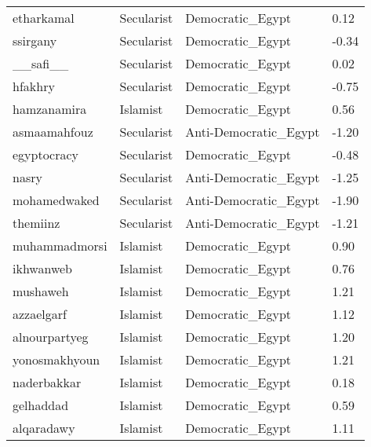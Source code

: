 \begin{longtable}{llll}
  etharkamal & Secularist & Democratic\_Egypt & 0.12 \\ 
  ssirgany & Secularist & Democratic\_Egypt & -0.34 \\ 
  \_\_safi\_\_ & Secularist & Democratic\_Egypt & 0.02 \\ 
  hfakhry & Secularist & Democratic\_Egypt & -0.75 \\ 
  hamzanamira & Islamist & Democratic\_Egypt & 0.56 \\ 
  asmaamahfouz & Secularist & Anti-Democratic\_Egypt & -1.20 \\ 
  egyptocracy & Secularist & Democratic\_Egypt & -0.48 \\ 
  nasry & Secularist & Anti-Democratic\_Egypt & -1.25 \\ 
  mohamedwaked & Secularist & Anti-Democratic\_Egypt & -1.90 \\ 
  themiinz & Secularist & Anti-Democratic\_Egypt & -1.21 \\ 
  muhammadmorsi & Islamist & Democratic\_Egypt & 0.90 \\ 
  ikhwanweb & Islamist & Democratic\_Egypt & 0.76 \\ 
  mushaweh & Islamist & Democratic\_Egypt & 1.21 \\ 
  azzaelgarf & Islamist & Democratic\_Egypt & 1.12 \\ 
  alnourpartyeg & Islamist & Democratic\_Egypt & 1.20 \\ 
  yonosmakhyoun & Islamist & Democratic\_Egypt & 1.21 \\ 
  naderbakkar & Islamist & Democratic\_Egypt & 0.18 \\ 
  gelhaddad & Islamist & Democratic\_Egypt & 0.59 \\ 
  alqaradawy & Islamist & Democratic\_Egypt & 1.11 \\ 
   \bottomrule
\end{longtable}
